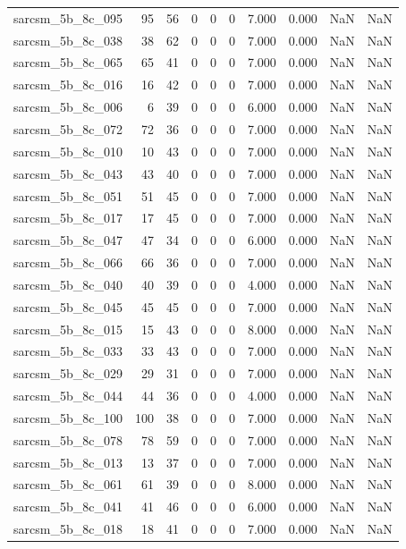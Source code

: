 \documentclass{article}
\begin{document}
\begin{longtable}{lrrrrrrrrr}
sarcsm\_5b\_8c\_095 & 95 & 56 & 0 & 0 & 0 & 7.000 & 0.000 & NaN & NaN \\
sarcsm\_5b\_8c\_038 & 38 & 62 & 0 & 0 & 0 & 7.000 & 0.000 & NaN & NaN \\
sarcsm\_5b\_8c\_065 & 65 & 41 & 0 & 0 & 0 & 7.000 & 0.000 & NaN & NaN \\
sarcsm\_5b\_8c\_016 & 16 & 42 & 0 & 0 & 0 & 7.000 & 0.000 & NaN & NaN \\
sarcsm\_5b\_8c\_006 & 6 & 39 & 0 & 0 & 0 & 6.000 & 0.000 & NaN & NaN \\
sarcsm\_5b\_8c\_072 & 72 & 36 & 0 & 0 & 0 & 7.000 & 0.000 & NaN & NaN \\
sarcsm\_5b\_8c\_010 & 10 & 43 & 0 & 0 & 0 & 7.000 & 0.000 & NaN & NaN \\
sarcsm\_5b\_8c\_043 & 43 & 40 & 0 & 0 & 0 & 7.000 & 0.000 & NaN & NaN \\
sarcsm\_5b\_8c\_051 & 51 & 45 & 0 & 0 & 0 & 7.000 & 0.000 & NaN & NaN \\
sarcsm\_5b\_8c\_017 & 17 & 45 & 0 & 0 & 0 & 7.000 & 0.000 & NaN & NaN \\
sarcsm\_5b\_8c\_047 & 47 & 34 & 0 & 0 & 0 & 6.000 & 0.000 & NaN & NaN \\
sarcsm\_5b\_8c\_066 & 66 & 36 & 0 & 0 & 0 & 7.000 & 0.000 & NaN & NaN \\
sarcsm\_5b\_8c\_040 & 40 & 39 & 0 & 0 & 0 & 4.000 & 0.000 & NaN & NaN \\
sarcsm\_5b\_8c\_045 & 45 & 45 & 0 & 0 & 0 & 7.000 & 0.000 & NaN & NaN \\
sarcsm\_5b\_8c\_015 & 15 & 43 & 0 & 0 & 0 & 8.000 & 0.000 & NaN & NaN \\
sarcsm\_5b\_8c\_033 & 33 & 43 & 0 & 0 & 0 & 7.000 & 0.000 & NaN & NaN \\
sarcsm\_5b\_8c\_029 & 29 & 31 & 0 & 0 & 0 & 7.000 & 0.000 & NaN & NaN \\
sarcsm\_5b\_8c\_044 & 44 & 36 & 0 & 0 & 0 & 4.000 & 0.000 & NaN & NaN \\
sarcsm\_5b\_8c\_100 & 100 & 38 & 0 & 0 & 0 & 7.000 & 0.000 & NaN & NaN \\
sarcsm\_5b\_8c\_078 & 78 & 59 & 0 & 0 & 0 & 7.000 & 0.000 & NaN & NaN \\
sarcsm\_5b\_8c\_013 & 13 & 37 & 0 & 0 & 0 & 7.000 & 0.000 & NaN & NaN \\
sarcsm\_5b\_8c\_061 & 61 & 39 & 0 & 0 & 0 & 8.000 & 0.000 & NaN & NaN \\
sarcsm\_5b\_8c\_041 & 41 & 46 & 0 & 0 & 0 & 6.000 & 0.000 & NaN & NaN \\
sarcsm\_5b\_8c\_018 & 18 & 41 & 0 & 0 & 0 & 7.000 & 0.000 & NaN & NaN \\

\end{longtable}
\end{document}
